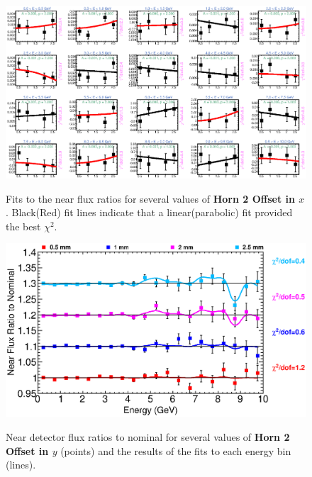 \begin{figure}[ht]
  \begin{center}
    {\includegraphics[width=5.0in]{figures/Horn2XOffset_near_fits.eps}}
  \end{center}
\caption{ Fits to the near flux ratios for several values of {\bf Horn 2 Offset in $x$}. Black(Red) fit lines indicate that a linear(parabolic) fit provided the best $\chi^2$. }
\end{figure}

\begin{figure}[ht]
  \begin{center}
    {\includegraphics[width=6.0in]{figures/Horn2YOffset_near_summary.eps}}
  \end{center}
\caption{ Near detector flux ratios to nominal for several values of {\bf Horn 2 Offset in $y$} (points) and the results of the fits to each energy bin (lines).}
\end{figure}

